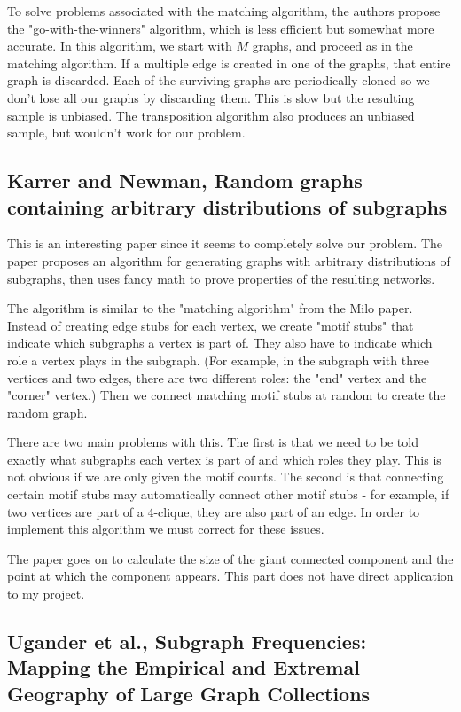 \documentclass[12pt]{article}
\begin{document}
To solve problems associated with the matching algorithm, the authors propose the "go-with-the-winners" algorithm, which is less efficient but somewhat more accurate.  In this algorithm, we start with $M$ graphs, and proceed as in the matching algorithm.  If a multiple edge is created in one of the graphs, that entire graph is discarded.  Each of the surviving graphs are periodically cloned so we don't lose all our graphs by discarding them.  This is slow but the resulting sample is unbiased.  The transposition algorithm also produces an unbiased sample, but wouldn't work for our problem.

\subsection{Karrer and Newman, Random graphs containing arbitrary distributions of subgraphs \cite{karrer}}

This is an interesting paper since it seems to completely solve our problem.  The paper proposes an algorithm for generating graphs with arbitrary distributions of subgraphs, then uses fancy math to prove properties of the resulting networks.

The algorithm is similar to the "matching algorithm" from the Milo paper.  Instead of creating edge stubs for each vertex, we create "motif stubs" that indicate which subgraphs a vertex is part of.  They also have to indicate which role a vertex plays in the subgraph.  (For example, in the subgraph with three vertices and two edges, there are two different roles: the "end" vertex and the "corner" vertex.)  Then we connect matching motif stubs at random to create the random graph.

There are two main problems with this.  The first is that we need to be told exactly what subgraphs each vertex is part of and which roles they play.  This is not obvious if we are only given the motif counts.  The second is that connecting certain motif stubs may automatically connect other motif stubs - for example, if two vertices are part of a 4-clique, they are also part of an edge.  In order to implement this algorithm we must correct for these issues.

The paper goes on to calculate the size of the giant connected component and the point at which the component appears.  This part does not have direct application to my project.

\subsection{Ugander et al., Subgraph Frequencies: Mapping the Empirical and
Extremal Geography of Large Graph Collections \cite{ugander}}
\end{document}
